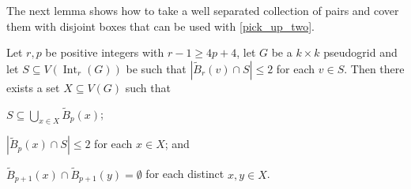\documentclass{patmorin}
\DeclareMathOperator{\interior}{Int}
\begin{document}
The next lemma shows how to take a well separated collection of pairs and cover them with disjoint boxes that can be used with \cref{pick_up_two}.

\begin{lem}\label{make_disjoint}
  Let $r,p$ be positive integers with $r-1\ge 4p+4$, let $G$ be a $k\times k$ pseudogrid and let $S\subseteq V(\interior_r(G))$ be such that $|\tilde{B}_{r}(v)\cap S|\le 2$ for each $v\in S$.
  Then there exists a set $X\subseteq V(G)$ such that
  \begin{compactenum}[(i)]
    \item \label{covers_s} $S\subseteq\bigcup_{x\in X}\tilde{B}_{p}(x)$;
    \item \label{two_per_box} $|\tilde{B}_{p}(x)\cap S|\le 2$ for each $x\in X$; and
    \item \label{disjoint_boxes} $\tilde{B}_{p+1}(x)\cap \tilde{B}_{p+1}(y)=\emptyset$ for each distinct $x,y\in X$.
  \end{compactenum}
\end{lem}
\end{document}
